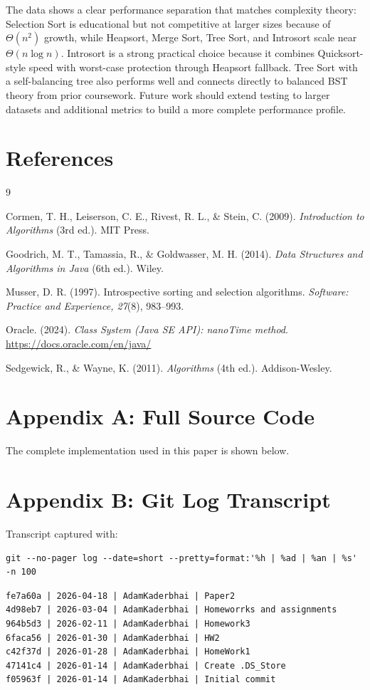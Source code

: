 \documentclass[12pt]{article}
\begin{document}
The data shows a clear performance separation that matches complexity theory: Selection Sort is educational but not competitive at larger sizes because of $\Theta(n^2)$ growth, while Heapsort, Merge Sort, Tree Sort, and Introsort scale near $\Theta(n \log n)$. Introsort is a strong practical choice because it combines Quicksort-style speed with worst-case protection through Heapsort fallback. Tree Sort with a self-balancing tree also performs well and connects directly to balanced BST theory from prior coursework. Future work should extend testing to larger datasets and additional metrics to build a more complete performance profile.

\section{References}
\begin{thebibliography}{9}

\bibitem{} Cormen, T. H., Leiserson, C. E., Rivest, R. L., \& Stein, C. (2009). \textit{Introduction to Algorithms} (3rd ed.). MIT Press.

\bibitem{} Goodrich, M. T., Tamassia, R., \& Goldwasser, M. H. (2014). \textit{Data Structures and Algorithms in Java} (6th ed.). Wiley.

\bibitem{} Musser, D. R. (1997). Introspective sorting and selection algorithms. \textit{Software: Practice and Experience, 27}(8), 983--993.

\bibitem{} Oracle. (2024). \textit{Class System (Java SE API): nanoTime method}. \url{https://docs.oracle.com/en/java/}

\bibitem{} Sedgewick, R., \& Wayne, K. (2011). \textit{Algorithms} (4th ed.). Addison-Wesley.

\end{thebibliography}

\appendix

\section{Appendix A: Full Source Code}
\noindent The complete implementation used in this paper is shown below.



\section{Appendix B: Git Log Transcript}
\noindent Transcript captured with:
\begin{verbatim}
git --no-pager log --date=short --pretty=format:'%h | %ad | %an | %s' -n 100
\end{verbatim}

\begin{verbatim}
fe7a60a | 2026-04-18 | AdamKaderbhai | Paper2
4d98eb7 | 2026-03-04 | AdamKaderbhai | Homeworrks and assignments
964b5d3 | 2026-02-11 | AdamKaderbhai | Homework3
6faca56 | 2026-01-30 | AdamKaderbhai | HW2
c42f37d | 2026-01-28 | AdamKaderbhai | HomeWork1
47141c4 | 2026-01-14 | AdamKaderbhai | Create .DS_Store
f05963f | 2026-01-14 | AdamKaderbhai | Initial commit
\end{verbatim}
\end{document}
